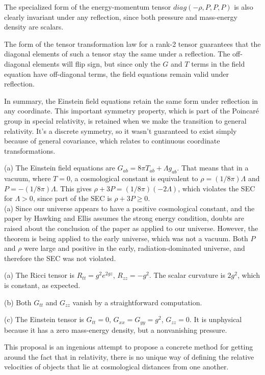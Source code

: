 The specialized form of the energy-momentum tensor $diag(-\rho,P,P,P)$ is also clearly invariant under
any reflection, since both pressure and mass-energy density are scalars.

The form of the tensor transformation law for a rank-2 tensor guarantees that the diagonal elements of such
a tensor stay the same under a reflection. The off-diagonal elements will flip sign, but since only the
$G$ and $T$ terms in the field equation have off-diagonal terms, the field equations remain valid under
reflection.

In summary, the Einstein field equations retain the same form under reflection in any coordinate. This
important symmetry property, which is part of the  Poincar\'{e} group in special relativity,
is retained when we make the transition to general relativity. It's a discrete symmetry, so it wasn't guaranteed
to exist simply because of general covariance, which relates to continuous coordinate transformations.

(a) The Einstein field equations are $G_{ab}=8\pi T_{ab}+\Lambda g_{ab}$.
That means that in a vacuum, where $T=0$, a cosmological constant is equivalent to $\rho=(1/8\pi)\Lambda$ and $P=-(1/8\pi)\Lambda$. 
This gives $\rho+3P=(1/8\pi)(-2\Lambda)$, which violates the SEC for $\Lambda>0$, since part of the SEC is $\rho+3P \ge 0$.\\
(a) Since our universe appears to have a positive cosmological constant, and the paper by Hawking and Ellis
assumes the strong energy condition, doubts are raised about the conclusion of the paper as applied to our universe.
However, the theorem is being applied to the early universe, which was not a vacuum. Both $P$ and $\rho$ were
large and positive in the early, radiation-dominated universe, and therefore the SEC was not violated.


(a) The Ricci tensor is $R_{tt}=g^2e^{2gz}$, $R_{zz}=-g^2$. The scalar curvature is $2g^2$, which is constant, as expected.

(b) Both $G_{tt}$ and $G_{zz}$ vanish by a straightforward computation.

(c) The Einstein tensor is $G_{tt}=0$, $G_{xx}=G_{yy}=g^2$, $G_{zz}=0$. It is unphysical because it has a zero mass-energy density,
but a nonvanishing pressure.


This proposal is an ingenious attempt to propose a concrete method for getting around the fact that in relativity,
there is no unique way of defining the relative velocities of objects that lie at cosmological distances from one
another.

